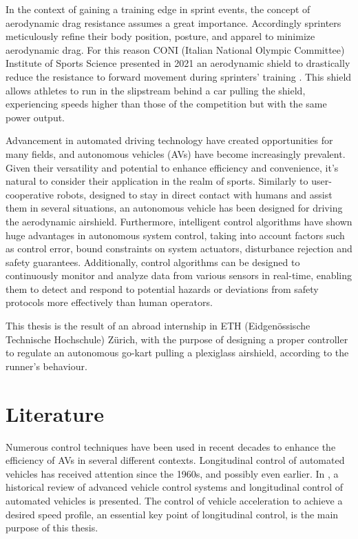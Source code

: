 \documentclass[a4paper,12pt,oneside]{book}
\begin{document}
In the context of gaining a training edge in sprint events, the concept of aerodynamic drag resistance assumes a great importance. 
Accordingly sprinters meticulously refine their body position, posture, and apparel to minimize aerodynamic drag. 
For this reason CONI (Italian National Olympic Committee) Institute of Sports Science presented in 2021 an aerodynamic shield to drastically reduce the resistance to forward movement during sprinters' training \cite{Coni_article}. 
This shield allows athletes to run in the slipstream behind a car pulling the shield, experiencing speeds higher than those of the competition but with the same power output. 
\bigskip

Advancement in automated driving technology have created opportunities for many fields, and autonomous vehicles (AVs) have become increasingly prevalent. 
Given their versatility and potential to enhance efficiency and convenience, it's natural to consider their application in the realm of sports. 
Similarly to user-cooperative robots, designed to stay in direct contact with humans and assist them in several situations, an autonomous vehicle has been designed for driving the aerodynamic airshield. 
Furthermore, intelligent control algorithms have shown huge advantages in autonomous system control, taking into account factors such as control error, bound constraints on system actuators, disturbance rejection and safety guarantees. 
Additionally, control algorithms can be designed to continuously monitor and analyze data from various sensors in real-time, enabling them to detect and respond to potential hazards or deviations from safety protocols more effectively than human operators.
\bigskip

This thesis is the result of an abroad internship in ETH (Eidgen\"ossische Technische Hochschule) Z\"urich, with the purpose of designing a proper controller to regulate an autonomous go-kart pulling a plexiglass airshield, according to the runner's behaviour.

		
\section*{Literature}
Numerous control techniques have been used in recent decades to enhance the efficiency of AVs in several different contexts.
Longitudinal control of automated vehicles has received attention since the 1960s, and possibly even earlier.
In \cite{Review_AVCS}, a historical review of advanced vehicle control systems and longitudinal control of automated vehicles is presented.
The control of vehicle acceleration to achieve a desired speed profile, an essential key point of longitudinal control, is the main purpose of this thesis.
\end{document}
